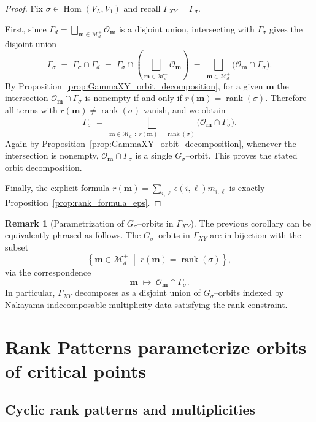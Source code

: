 \documentclass{article}
\newcommand{\Hom}{\operatorname{Hom}}
\newcommand{\rank}{\operatorname{rank}}
\theoremstyle{definition}
\newtheorem{remark}[theorem]{Remark}
\begin{document}
\begin{proof}
Fix $\sigma\in\Hom(V_L,V_1)$ and recall $\Gamma_{XY}=\Gamma_\sigma$.

First, since $\Gamma_d=\bigsqcup_{\mathbf m\in\mathcal M_d^+}\mathcal O_{\mathbf m}$ is a disjoint union,
intersecting with $\Gamma_\sigma$ gives the disjoint union
\[
\Gamma_\sigma
\;=\;
\Gamma_\sigma\cap \Gamma_d
\;=\;
\Gamma_\sigma \cap \left(\bigsqcup_{\mathbf m\in\mathcal M_d^+}\mathcal O_{\mathbf m}\right)
\;=\;
\bigsqcup_{\mathbf m\in\mathcal M_d^+}\big(\mathcal O_{\mathbf m}\cap \Gamma_\sigma\big).
\]
By Proposition~\ref{prop:GammaXY_orbit_decomposition}, for a given $\mathbf m$ the intersection
$\mathcal O_{\mathbf m}\cap \Gamma_\sigma$ is nonempty if and only if
$r(\mathbf m)=\rank(\sigma)$. Therefore all terms with $r(\mathbf m)\neq\rank(\sigma)$ vanish,
and we obtain
\[
\Gamma_\sigma
\;=\;
\bigsqcup_{\mathbf m\in\mathcal M_d^+\;:\; r(\mathbf m)=\rank(\sigma)}
\big(\mathcal O_{\mathbf m}\cap \Gamma_\sigma\big).
\]
Again by Proposition~\ref{prop:GammaXY_orbit_decomposition}, whenever the intersection is nonempty,
$\mathcal O_{\mathbf m}\cap \Gamma_\sigma$ is a single $G_\sigma$--orbit. This proves the stated orbit
decomposition.

Finally, the explicit formula $r(\mathbf m)=\sum_{i,\ell}\epsilon(i,\ell)m_{i,\ell}$ is exactly
Proposition~\ref{prop:rank_formula_eps}.
\end{proof}
\begin{remark}[Parametrization of $G_\sigma$--orbits in $\Gamma_{XY}$]
\label{rem:GammaXY_Gsigma_orbits}
The previous corollary can be equivalently phrased as follows.
The $G_\sigma$--orbits in $\Gamma_{XY}$ are in bijection with the subset
\[
\left\{\mathbf m\in \mathcal M_d^+ \;\middle|\; r(\mathbf m)=\rank(\sigma)\right\},
\]
via the correspondence
\[
\mathbf m
\;\longmapsto\;
\mathcal O_{\mathbf m}\cap \Gamma_\sigma.
\]
In particular, $\Gamma_{XY}$ decomposes as a disjoint union of $G_\sigma$--orbits indexed by
Nakayama indecomposable multiplicity data satisfying the rank constraint.
\end{remark}
\section{Rank Patterns parameterize orbits of critical points}
\subsection{Cyclic rank patterns and multiplicities}
\end{document}
